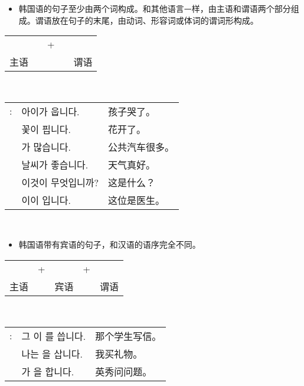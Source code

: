 \begin{grammar}
    \begin{grammarsect}[句子结构]
    \begin{itemize}
        \item 韩国语的句子至少由两个词构成。和其他语言ᅳ样，由主语和谓语两个部分组成。谓语放在句子的末尾，由动词、形容词或体词的谓词形构成。
    \end{itemize}
    \begin{center}
    \begin{tabular}{lllll}
        \ruby{主語}{주어}&\qquad&+&\qquad&\ruby{敘述語}{서술어}\\
        主语&\qquad&&\qquad&谓语
    \end{tabular}\\
    \end{center}
    \begin{tabular}{lll}
        \ruby{例}{예}: &아이가 웁니다.&孩子哭了。\\
        &꽃이 핍니다.&花开了。\\
        &\ruby{버스}{bus}가 많습니다.&公共汽车很多。\\
        &날씨가 좋습니다.&天气真好。\\
        &이것이 무엇입니까?&这是什么？\\
        &이\ruby{分}{분}이 \ruby{醫師}{의사}입니다.&这位是医生。
    \end{tabular}\\
    \end{grammarsect}
    \begin{itemize}
        \item 韩国语带有宾语的句子，和汉语的语序完全不同。
    \end{itemize}
    \begin{center}
    \begin{tabular}{lllll}
        \ruby{主語}{주어}&+&\ruby{目的語}{목적어}&+&\ruby{敘述語}{서술어}\\
        主语&&宾语&&谓语
    \end{tabular}\\
    \end{center}
    \begin{tabular}{lll}
        \ruby{例}{예}: &그 \ruby{學生}{학생}이 \ruby{便紙}{편지}를 씁니다.&那个学生写信。\\
        &나는 \ruby{膳物}{선물}을 삽니다.&我买礼物。\\
        &\ruby{英秀}{영수}가 \ruby{質問}{질문}을 합니다.&英秀问问题。
    \end{tabular}\\
\end{grammar}
